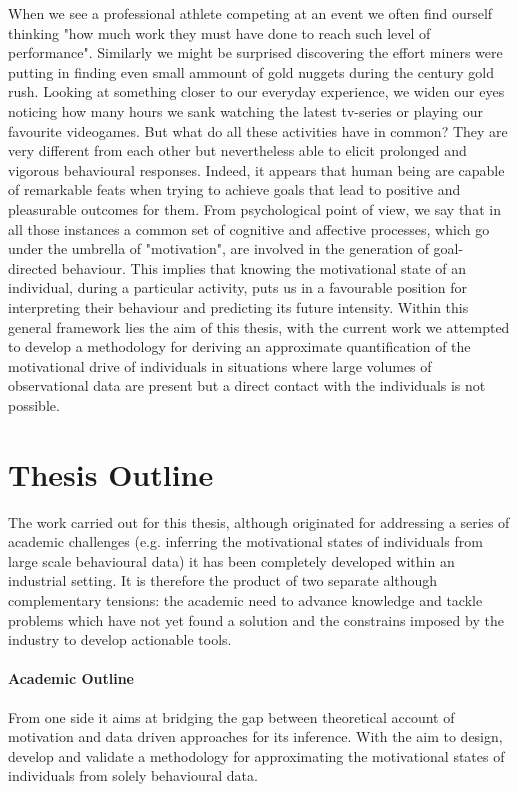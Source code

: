 When we see a professional athlete competing at an event we often find ourself thinking "how much work they must have done to reach such level of performance". Similarly we might be surprised discovering the effort miners were putting in finding even small ammount of gold nuggets during the  century gold rush. Looking at something closer to our everyday experience, we widen our eyes noticing how many hours we sank watching the latest tv-series or playing our favourite videogames. But what do all these activities have in common? They are very different from each other but nevertheless able to elicit prolonged and vigorous behavioural responses. Indeed, it appears that human being are capable of remarkable feats when trying to achieve goals that lead to positive and pleasurable outcomes for them. From psychological point of view, we say that in all those instances a common set of cognitive and affective processes, which go under the umbrella of "motivation", are involved in the generation of goal-directed behaviour. This implies that knowing the motivational state of an individual, during a particular activity, puts us in a favourable position for interpreting their behaviour and predicting its future intensity. Within this general framework lies the aim of this thesis, with the current work we attempted to develop a methodology for deriving an approximate quantification of the motivational drive of individuals in situations where large volumes of observational data are present but a direct contact with the individuals is not possible.

\section*{Thesis Outline}
The work carried out for this thesis, although originated for addressing a series of academic challenges (e.g. inferring the motivational states of individuals from large scale behavioural data) it has been completely developed within an industrial setting. It is therefore the product of two separate although complementary tensions: the academic need to advance knowledge and tackle problems which have not yet found a solution and the constrains imposed by the industry to develop actionable tools.

\paragraph*{Academic Outline}
From one side it aims at bridging the gap between theoretical account of motivation and data driven approaches for its inference. With the aim to design, develop and validate a methodology for approximating the motivational states of individuals from solely behavioural data. 
